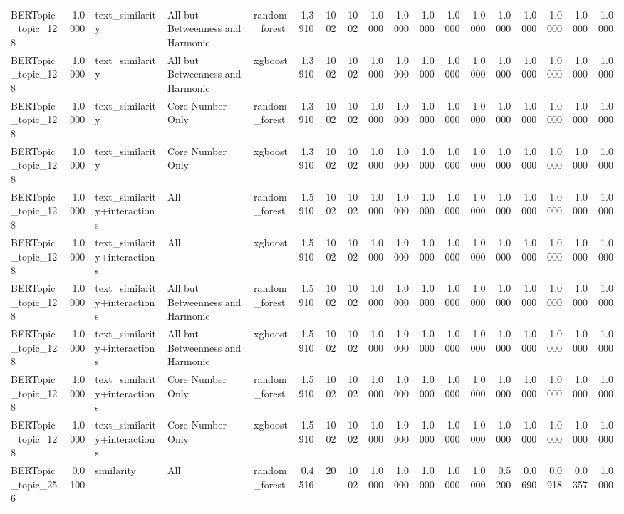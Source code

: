 \begin{tabular}{lrlllrrrrrrrrrrrrr}
BERTopic_topic_128 & 1.0000 & text_similarity & All but Betweenness and Harmonic & random_forest & 1.3910 & 1002 & 1002 & 1.0000 & 1.0000 & 1.0000 & 1.0000 & 1.0000 & 1.0000 & 1.0000 & 1.0000 & 1.0000 & 1.0000 \\
BERTopic_topic_128 & 1.0000 & text_similarity & All but Betweenness and Harmonic & xgboost & 1.3910 & 1002 & 1002 & 1.0000 & 1.0000 & 1.0000 & 1.0000 & 1.0000 & 1.0000 & 1.0000 & 1.0000 & 1.0000 & 1.0000 \\
BERTopic_topic_128 & 1.0000 & text_similarity & Core Number Only & random_forest & 1.3910 & 1002 & 1002 & 1.0000 & 1.0000 & 1.0000 & 1.0000 & 1.0000 & 1.0000 & 1.0000 & 1.0000 & 1.0000 & 1.0000 \\
BERTopic_topic_128 & 1.0000 & text_similarity & Core Number Only & xgboost & 1.3910 & 1002 & 1002 & 1.0000 & 1.0000 & 1.0000 & 1.0000 & 1.0000 & 1.0000 & 1.0000 & 1.0000 & 1.0000 & 1.0000 \\
BERTopic_topic_128 & 1.0000 & text_similarity+interactions & All & random_forest & 1.5910 & 1002 & 1002 & 1.0000 & 1.0000 & 1.0000 & 1.0000 & 1.0000 & 1.0000 & 1.0000 & 1.0000 & 1.0000 & 1.0000 \\
BERTopic_topic_128 & 1.0000 & text_similarity+interactions & All & xgboost & 1.5910 & 1002 & 1002 & 1.0000 & 1.0000 & 1.0000 & 1.0000 & 1.0000 & 1.0000 & 1.0000 & 1.0000 & 1.0000 & 1.0000 \\
BERTopic_topic_128 & 1.0000 & text_similarity+interactions & All but Betweenness and Harmonic & random_forest & 1.5910 & 1002 & 1002 & 1.0000 & 1.0000 & 1.0000 & 1.0000 & 1.0000 & 1.0000 & 1.0000 & 1.0000 & 1.0000 & 1.0000 \\
BERTopic_topic_128 & 1.0000 & text_similarity+interactions & All but Betweenness and Harmonic & xgboost & 1.5910 & 1002 & 1002 & 1.0000 & 1.0000 & 1.0000 & 1.0000 & 1.0000 & 1.0000 & 1.0000 & 1.0000 & 1.0000 & 1.0000 \\
BERTopic_topic_128 & 1.0000 & text_similarity+interactions & Core Number Only & random_forest & 1.5910 & 1002 & 1002 & 1.0000 & 1.0000 & 1.0000 & 1.0000 & 1.0000 & 1.0000 & 1.0000 & 1.0000 & 1.0000 & 1.0000 \\
BERTopic_topic_128 & 1.0000 & text_similarity+interactions & Core Number Only & xgboost & 1.5910 & 1002 & 1002 & 1.0000 & 1.0000 & 1.0000 & 1.0000 & 1.0000 & 1.0000 & 1.0000 & 1.0000 & 1.0000 & 1.0000 \\
BERTopic_topic_256 & 0.0100 & similarity & All & random_forest & 0.4516 & 20 & 1002 & 1.0000 & 1.0000 & 1.0000 & 1.0000 & 1.0000 & 0.5200 & 0.0690 & 0.0918 & 0.0357 & 1.0000 \\

\end{tabular}
